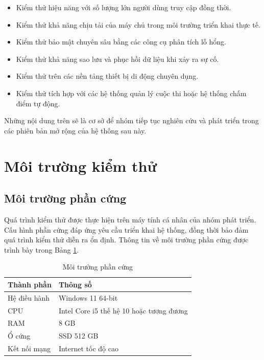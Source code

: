 \begin{itemize}
	\item Kiểm thử hiệu năng với số lượng lớn người dùng truy cập đồng thời.
	
	\item Kiểm thử khả năng chịu tải của máy chủ trong môi trường triển khai thực tế.
	
	\item Kiểm thử bảo mật chuyên sâu bằng các công cụ phân tích lỗ hổng.
	
	\item Kiểm thử khả năng sao lưu và phục hồi dữ liệu khi xảy ra sự cố.
	
	\item Kiểm thử trên các nền tảng thiết bị di động chuyên dụng.
	
	\item Kiểm thử tích hợp với các hệ thống quản lý cuộc thi hoặc hệ thống chấm điểm tự động.
\end{itemize}

Những nội dung trên sẽ là cơ sở để nhóm tiếp tục nghiên cứu và phát triển trong các phiên bản mở rộng của hệ thống sau này.
\section{Môi trường kiểm thử}

\subsection{Môi trường phần cứng}

Quá trình kiểm thử được thực hiện trên máy tính cá nhân của nhóm phát triển. Cấu hình phần cứng đáp ứng yêu cầu triển khai hệ thống, đồng thời bảo đảm quá trình kiểm thử diễn ra ổn định. Thông tin về môi trường phần cứng được trình bày trong Bảng \ref{tab:hardware_environment}.

\begin{table}[H]
	\centering
	\caption{Môi trường phần cứng}
	\label{tab:hardware_environment}
	\renewcommand{\arraystretch}{1.3}
	\begin{tabular}{|p{5cm}|p{8cm}|}
		\hline
		\textbf{Thành phần} & \textbf{Thông số} \\
		\hline
		Hệ điều hành & Windows 11 64-bit \\
		\hline
		CPU & Intel Core i5 thế hệ 10 hoặc tương đương \\
		\hline
		RAM & 8 GB \\
		\hline
		Ổ cứng & SSD 512 GB \\
		\hline
		Kết nối mạng & Internet tốc độ cao \\
		\hline
	\end{tabular}
\end{table}

